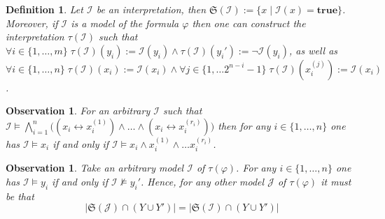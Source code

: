 \documentclass [11pt]{article}
\newcommand{\True}{\mathbf{true}}
\newcommand{\nmodels}{\not\models}
\newtheorem{observation}[theorem]{Observation}
\newtheorem{definition}[theorem]{Definition}
\begin{document}
\begin{definition}
Let $\mathcal{I}$ be an interpretation, then $\mathfrak{S}(\mathcal{I}):=\{x \mid \mathcal{I}(x)=\True\}$. Moreover, if $\mathcal{I}$ is a model of the formula $\varphi$ then one can construct the interpretation $\tau(\mathcal{I})$ such that $\forall i \in \{1, \dots , m\} \;\tau(\mathcal{I})(y_i):=\mathcal{I}(y_i) \land \tau(\mathcal{I})(y_i'):=\neg \mathcal{I}(y_i)$, as well as $\forall i \in \{1, \dots , n\}  \; \tau(\mathcal{I})(x_i):=\mathcal{I}(x_i) \land \forall j \in \{1, \dots 2^{n-i}-1\} \; \tau(\mathcal{I})(x_i^{(j)}):=\mathcal{I}(x_i)$.
\end{definition}


\begin{observation}
\label{obs:1a}
For an arbitrary $\mathcal{I}$ such that $ \mathcal{I} \models \bigwedge_{i=1}^n 
\big( (x_i \leftrightarrow x_i^{(1)}) \wedge \dots
\wedge (x_i \leftrightarrow x_i^{(r_i)})
\big) $ then for any $i \in \{1, \dots , n\}$ one has $\mathcal{I} \models x_i$ if and only if $\mathcal{I} \models  x_i \land x_i^{(1)} \land \dots x_i^{(r_i)}$. 
\end{observation}

\begin{observation}
\label{obs:1b}
Take an arbitrary model $\mathcal{I}$ of $\tau(\varphi)$. For any $i \in \{1, \dots,n\}$ one has $\mathcal{I} \models y_i$ if and only if $\mathcal{I} \nmodels y_i'$. Hence, for any other model $\mathcal{J}$ of $\tau(\varphi)$ it must be that
\begin{equation*}
|\mathfrak{S}(\mathcal{J}) \cap (Y \cup Y')|=|\mathfrak{S}(\mathcal{I}) \cap (Y \cup Y')|
\end{equation*}
\end{observation}
\end{document}
